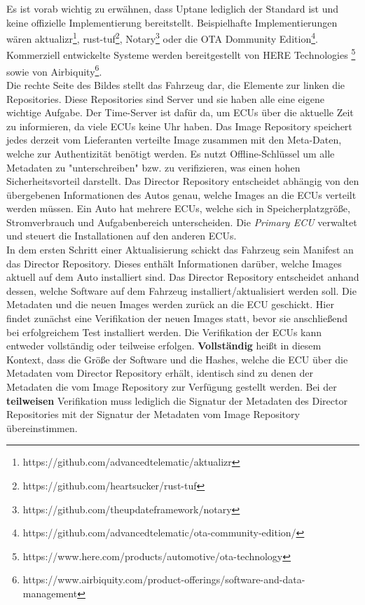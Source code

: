 Es ist vorab wichtig zu erwähnen, dass Uptane lediglich der Standard ist und keine offizielle Implementierung bereitstellt. Beispielhafte Implementierungen wären aktualizr\footnote{https://github.com/advancedtelematic/aktualizr},  rust-tuf\footnote{https://github.com/heartsucker/rust-tuf}, Notary\footnote{https://github.com/theupdateframework/notary} oder die OTA Dommunity Edition\footnote{https://github.com/advancedtelematic/ota-community-edition/}.
Kommerziell entwickelte Systeme werden bereitgestellt von HERE Technologies \footnote{https://www.here.com/products/automotive/ota-technology} sowie von   Airbiquity\footnote{https://www.airbiquity.com/product-offerings/software-and-data-management}.\\
Die rechte Seite des Bildes stellt das Fahrzeug dar, die Elemente zur linken die Repositories. Diese Repositories sind Server und sie haben alle eine eigene wichtige Aufgabe. Der Time-Server ist dafür da, um ECUs über die aktuelle Zeit zu informieren, da viele ECUs keine Uhr haben\cite{uptane}. Das Image Repository speichert jedes derzeit vom Lieferanten verteilte Image zusammen mit den Meta-Daten, welche zur Authentizität benötigt werden. Es nutzt Offline-Schlüssel um alle Metadaten zu "unterschreiben" bzw. zu verifizieren, was einen hohen Sicherheitsvorteil darstellt. Das Director Repository entscheidet abhängig von den übergebenen Informationen des Autos genau, welche Images an die ECUs verteilt werden müssen. Ein Auto hat mehrere ECUs, welche sich in Speicherplatzgröße, Stromverbrauch und Aufgabenbereich unterscheiden. Die \textit{Primary ECU} verwaltet und steuert die Installationen auf den anderen ECUs.\\

In dem ersten Schritt einer Aktualisierung schickt das Fahrzeug sein Manifest an das Director Repository. Dieses enthält Informationen darüber, welche Images aktuell auf dem Auto installiert sind. Das Director Repository entscheidet anhand dessen, welche Software auf dem Fahrzeug installiert/aktualisiert werden soll. Die Metadaten und die neuen Images werden zurück an die ECU geschickt. Hier findet zunächst eine Verifikation der neuen Images statt, bevor sie anschließend bei erfolgreichem Test installiert werden. Die Verifikation der ECUs kann entweder vollständig oder teilweise erfolgen. \textbf{Vollständig }heißt in diesem Kontext, dass die Größe der Software und die Hashes, welche die ECU über die Metadaten vom Director Repository erhält, identisch sind zu denen der Metadaten die vom Image Repository zur Verfügung gestellt werden. Bei der \textbf{teilweisen} Verifikation  muss lediglich die Signatur der Metadaten des Director Repositories mit der Signatur der Metadaten vom Image Repository übereinstimmen.
